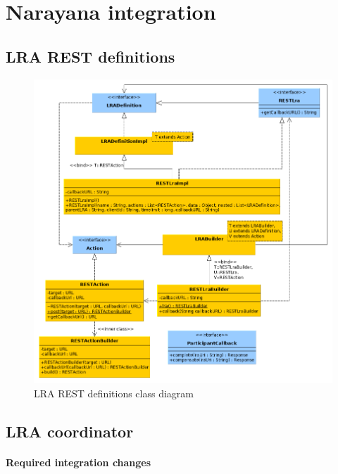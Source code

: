 \documentclass[oneside,
  digital, %
  table,   %
  lof,     %
  lot,     %
]{fithesis3}
\newcommand{\newlinepar}[1]{\paragraph{#1}\needspace{4\baselineskip}\mbox{}\\}
\begin{document}
\clearpage

\section{Narayana integration}

\subsection{LRA REST definitions}


\begin{figure}[!h]
    \begin{center}
        \includegraphics[trim=3cm 0 0 0,height=0.8\textheight]{images/classDiagrams/lra-rest-definitions.png}
    \end{center}
    \caption{LRA REST definitions class diagram}
    \label{fig:lra-rest-definitions-class-diagram}
\end{figure}

\clearpage

\subsection{LRA coordinator}

\newlinepar{Required integration changes}
\end{document}
